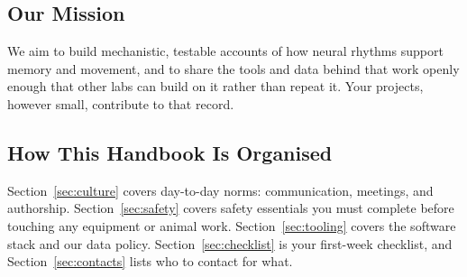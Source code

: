 \subsection*{Our Mission}
We aim to build mechanistic, testable accounts of how neural rhythms support memory and
movement, and to share the tools and data behind that work openly enough that other labs can
build on it rather than repeat it. Your projects, however small, contribute to that record.

\subsection*{How This Handbook Is Organised}
Section~\ref{sec:culture} covers day-to-day norms: communication, meetings, and authorship.
Section~\ref{sec:safety} covers safety essentials you must complete before touching any
equipment or animal work. Section~\ref{sec:tooling} covers the software stack and our data
policy. Section~\ref{sec:checklist} is your first-week checklist, and
Section~\ref{sec:contacts} lists who to contact for what.
